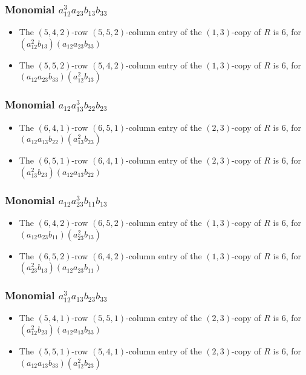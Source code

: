 \documentclass{article}
\begin{document}
\subsubsection{Monomial $ a_{12}^{3} a_{23} b_{13} b_{33} $}

\begin{itemize}
\item The $(5, 4, 2)$-row $(5, 5, 2)$-column entry of the $ \left(1, 3\right) $-copy of $R$ is $ 6 $, for $( a_{12}^{2} b_{13} )( a_{12} a_{23} b_{33} )$ 
\item The $(5, 5, 2)$-row $(5, 4, 2)$-column entry of the $ \left(1, 3\right) $-copy of $R$ is $ 6 $, for $( a_{12} a_{23} b_{33} )( a_{12}^{2} b_{13} )$ 
\end{itemize}
\subsubsection{Monomial $ a_{12} a_{13}^{3} b_{22} b_{23} $}

\begin{itemize}
\item The $(6, 4, 1)$-row $(6, 5, 1)$-column entry of the $ \left(2, 3\right) $-copy of $R$ is $ 6 $, for $( a_{12} a_{13} b_{22} )( a_{13}^{2} b_{23} )$ 
\item The $(6, 5, 1)$-row $(6, 4, 1)$-column entry of the $ \left(2, 3\right) $-copy of $R$ is $ 6 $, for $( a_{13}^{2} b_{23} )( a_{12} a_{13} b_{22} )$ 
\end{itemize}
\subsubsection{Monomial $ a_{12} a_{23}^{3} b_{11} b_{13} $}

\begin{itemize}
\item The $(6, 4, 2)$-row $(6, 5, 2)$-column entry of the $ \left(1, 3\right) $-copy of $R$ is $ 6 $, for $( a_{12} a_{23} b_{11} )( a_{23}^{2} b_{13} )$ 
\item The $(6, 5, 2)$-row $(6, 4, 2)$-column entry of the $ \left(1, 3\right) $-copy of $R$ is $ 6 $, for $( a_{23}^{2} b_{13} )( a_{12} a_{23} b_{11} )$ 
\end{itemize}
\subsubsection{Monomial $ a_{12}^{3} a_{13} b_{23} b_{33} $}

\begin{itemize}
\item The $(5, 4, 1)$-row $(5, 5, 1)$-column entry of the $ \left(2, 3\right) $-copy of $R$ is $ 6 $, for $( a_{12}^{2} b_{23} )( a_{12} a_{13} b_{33} )$ 
\item The $(5, 5, 1)$-row $(5, 4, 1)$-column entry of the $ \left(2, 3\right) $-copy of $R$ is $ 6 $, for $( a_{12} a_{13} b_{33} )( a_{12}^{2} b_{23} )$ 
\end{itemize}
\end{document}
